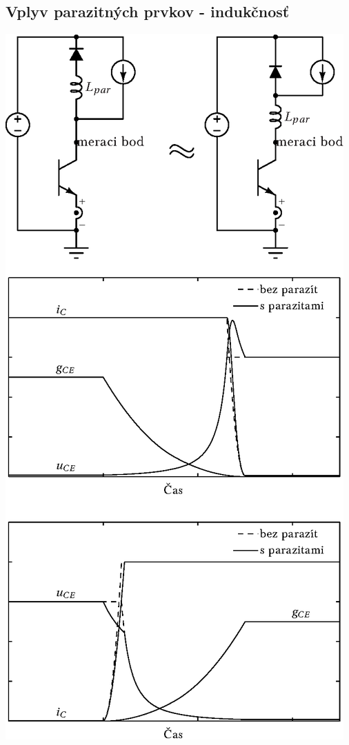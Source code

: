 \documentclass[oneside]{article}
\begin{document}
\subsection{Vplyv parazitných prvkov - indukčnosť} \label{subsec:parazity}
{ \centering
\includegraphics[height=.85\textheight]{obr/Lpar_prekmit}
}
\end{document}
